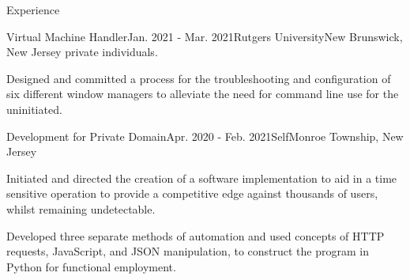 \documentclass{resume}
\begin{document}
\begin{rSection}{Experience}
\begin{rSubsection}{Virtual Machine Handler}{Jan. 2021 - Mar. 2021}{Rutgers University}{New Brunswick, New Jersey}
                private individuals.
            \item Designed and committed a process for the troubleshooting and
                configuration of six different window managers to alleviate the
                need for command line use for the uninitiated.
        \end{rSubsection}
        \begin{rSubsection}{Development for Private Domain}{Apr. 2020 - Feb. 2021}{Self}{Monroe Township, New Jersey}
            \item Initiated and directed the creation of a software
                implementation to aid in a time sensitive operation to provide
                a competitive edge against thousands of users, whilst remaining
                undetectable.
            \item Developed three separate methods of automation and used
                concepts of HTTP requests, JavaScript, and JSON manipulation,
                to construct the program in Python for functional employment.
        \end{rSubsection}
    \end{rSection}

\end{document}
